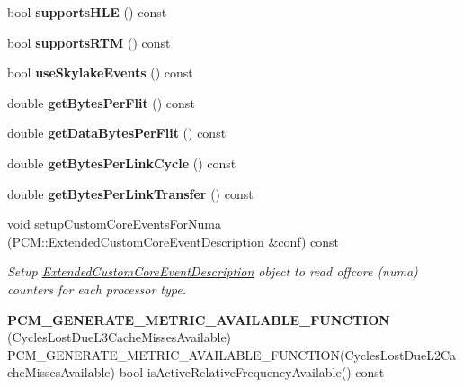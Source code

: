 \begin{DoxyCompactItemize}
\mbox{\label{class_p_c_m_a3fd40f38d7808f0500c89fd0fee37d7f}} 
bool {\bfseries supports\+H\+LE} () const
\item 
\mbox{\label{class_p_c_m_af716484d0216f34fc2012aa9287dd48f}} 
bool {\bfseries supports\+R\+TM} () const
\item 
\mbox{\label{class_p_c_m_a7f5aaa92b67a86c6e31e42a7ff072132}} 
bool {\bfseries use\+Skylake\+Events} () const
\item 
\mbox{\label{class_p_c_m_a27c442047ee84f0807ab61b81f9a7f1a}} 
double {\bfseries get\+Bytes\+Per\+Flit} () const
\item 
\mbox{\label{class_p_c_m_a579b94eed3d9bfa6a707bee9be0edf86}} 
double {\bfseries get\+Data\+Bytes\+Per\+Flit} () const
\item 
\mbox{\label{class_p_c_m_a03d9964b35c963041e923523bebbefdd}} 
double {\bfseries get\+Bytes\+Per\+Link\+Cycle} () const
\item 
\mbox{\label{class_p_c_m_af809894fbc9dda902300016cd4f4ad7b}} 
double {\bfseries get\+Bytes\+Per\+Link\+Transfer} () const
\item 
void \mbox{\hyperlink{class_p_c_m_aab6624cfd942b9727136dc59a2c7df87}{setup\+Custom\+Core\+Events\+For\+Numa}} (\mbox{\hyperlink{struct_p_c_m_1_1_extended_custom_core_event_description}{P\+C\+M\+::\+Extended\+Custom\+Core\+Event\+Description}} \&conf) const
\begin{DoxyCompactList}\small\item\em Setup \mbox{\hyperlink{struct_p_c_m_1_1_extended_custom_core_event_description}{Extended\+Custom\+Core\+Event\+Description}} object to read offcore (numa) counters for each processor type. \end{DoxyCompactList}\item 
\mbox{\label{class_p_c_m_a384a9b89191d22000c06cb821831da25}} 
{\bfseries P\+C\+M\+\_\+\+G\+E\+N\+E\+R\+A\+T\+E\+\_\+\+M\+E\+T\+R\+I\+C\+\_\+\+A\+V\+A\+I\+L\+A\+B\+L\+E\+\_\+\+F\+U\+N\+C\+T\+I\+ON} (Cycles\+Lost\+Due\+L3\+Cache\+Misses\+Available) P\+C\+M\+\_\+\+G\+E\+N\+E\+R\+A\+T\+E\+\_\+\+M\+E\+T\+R\+I\+C\+\_\+\+A\+V\+A\+I\+L\+A\+B\+L\+E\+\_\+\+F\+U\+N\+C\+T\+I\+ON(Cycles\+Lost\+Due\+L2\+Cache\+Misses\+Available) bool is\+Active\+Relative\+Frequency\+Available() const
\end{DoxyCompactItemize}
